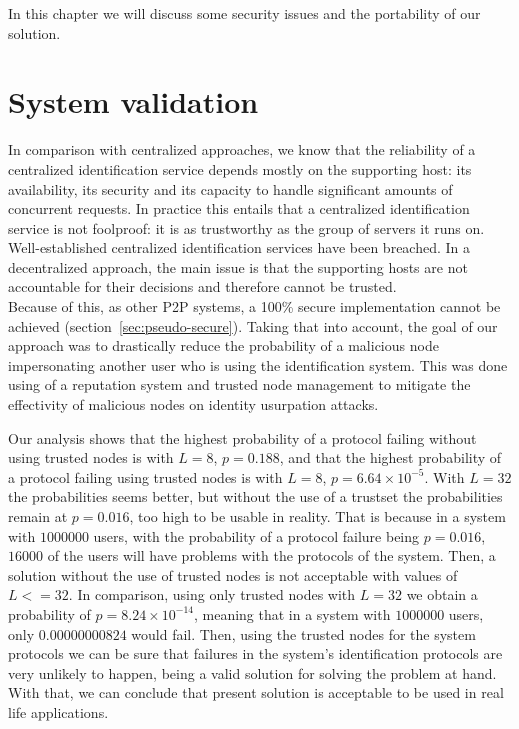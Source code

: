 In this chapter we will discuss some security issues and the portability of our
solution.%

\section{System validation}

In comparison with centralized approaches, we know that the reliability of a
centralized identification service depends mostly on the
supporting host: its availability, its security and its capacity  to handle
significant amounts of concurrent requests. 
In practice this entails that a centralized identification service is not
foolproof: it is as trustworthy as the group of servers it runs on.
Well-established centralized identification services have been breached. %
In a decentralized approach, the main issue is that the supporting hosts are
not accountable for their decisions and therefore cannot be trusted.\\

Because of this, as other P2P systems, a 100\% secure implementation cannot be achieved
(section~\ref{sec:pseudo-secure}).
Taking that into account, the goal of our approach was to drastically reduce the probability of a
malicious node impersonating another user who is using the identification
system. This was done using of a reputation system and trusted node management
to mitigate the effectivity of malicious nodes on identity usurpation attacks.

Our analysis shows that the highest probability of a protocol failing without using trusted nodes is 
with $L=8$, $p = 0.188$, and that the highest probability of a protocol failing
using trusted nodes is with $L=8$, $p = 6.64 \times 10^{-5}$. With $L=32$ the probabilities seems better, but without the use
of a trustset the probabilities remain at $p = 0.016$, too high to be usable in
reality. That is because in a system with $1000000$ users, with the probability
of a protocol failure being $p = 0.016$,  $16000$ of the users will have problems with
the protocols of the system. Then, a solution without the use of trusted nodes
is not acceptable with values of $L <= 32$. In comparison, using
only trusted nodes with $L=32$ we obtain a probability of $p =8.24 \times
10^{-14}$, meaning that in a system with $1000000$ users,
only $0.00000000824$ would fail.
Then, using the trusted nodes for the system protocols we can be sure that failures in the
system's identification protocols are very unlikely to happen, being a valid
solution for solving the problem at hand.
With that, we can conclude that present solution is acceptable to be
used in real life applications.


